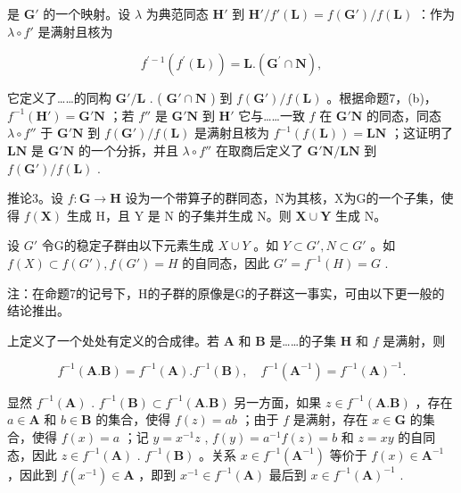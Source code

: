 是 \(\mathbf{G}'\) 的一个映射。设 \(\lambda\) 为典范同态 \(\mathbf{H}'\) 到 \(\mathbf{H}' / f'(\mathbf{L}) = f(\mathbf{G}') / f(\mathbf{L})\) ：作为 \(\lambda \circ f'\) 是满射且核为

\[
f ^ {\prime - 1} (f ^ {\prime} (\mathbf {L})) = \mathbf {L}. (\mathbf {G} ^ {\prime} \cap \mathbf {N}),
\]

它定义了……的同构 \(\mathbf{G}' / \mathbf{L}\) . ( \(\mathbf{G}' \cap \mathbf{N}\) ) 到 \(f(\mathbf{G}') / f(\mathbf{L})\) 。根据命题7，(b)， \(f^{-1}(\mathbf{H}') = \mathbf{G}'\mathbf{N}\) ；若 \(f''\) 是 \(\mathbf{G}'\mathbf{N}\) 到 \(\mathbf{H}'\) 它与……一致 \(f\) 在 \(\mathbf{G}'\mathbf{N}\) 的同态，同态 \(\lambda \circ f''\) 于 \(\mathbf{G}'\mathbf{N}\) 到 \(f(\mathbf{G}') / f(\mathbf{L})\) 是满射且核为 \(f^{-1}(f(\mathbf{L})) = \mathbf{L}\mathbf{N}\) ；这证明了 \(\mathbf{L}\mathbf{N}\) 是 \(\mathbf{G}'\mathbf{N}\) 的一个分拆，并且 \(\lambda \circ f''\) 在取商后定义了 \(\mathbf{G}'\mathbf{N} / \mathbf{L}\mathbf{N}\) 到 \(f(\mathbf{G}') / f(\mathbf{L})\) .

推论3。设 \(f: \mathbf{G} \to \mathbf{H}\) 设为一个带算子的群同态，N为其核，X为G的一个子集，使得 \(f(\mathbf{X})\) 生成 H，且 Y 是 N 的子集并生成 N。则 \(\mathbf{X} \cup \mathbf{Y}\) 生成 N。

设 \(G'\) 令G的稳定子群由以下元素生成 \(X \cup Y\) 。如 \(Y \subset G', N \subset G'\) 。如 \(f(X) \subset f(G'), f(G') = H\) 的自同态，因此 \(G' = f^{-1}(H) = G\) .

注：在命题7的记号下，H的子群的原像是G的子群这一事实，可由以下更一般的结论推出。

上定义了一个处处有定义的合成律。若 \(\mathbf{A}\) 和 \(\mathbf{B}\) 是……的子集 \(\mathbf{H}\) 和 \(f\) 是满射，则

\[
f^{-1} (\mathbf {A}. \mathbf {B}) = f^{-1} (\mathbf {A}). f^{-1} (\mathbf {B}), \quad f^{-1} (\mathbf {A} ^ {- 1}) = f^{-1} (\mathbf {A}) ^ {- 1}.
\]

显然 \(f^{-1}(\mathbf{A})\) . \(f^{-1}(\mathbf{B}) \subset f^{-1}(\mathbf{A}.\mathbf{B})\) 另一方面，如果 \(z \in f^{-1}(\mathbf{A}.\mathbf{B})\) ，存在 \(a \in \mathbf{A}\) 和 \(b \in \mathbf{B}\) 的集合，使得 \(f(z) = ab\) ；由于 \(f\) 是满射，存在 \(x \in \mathbf{G}\) 的集合，使得 \(f(x) = a\) ；记 \(y = x^{-1}z\) , \(f(y) = a^{-1}f(z) = b\) 和 \(z = xy\) 的自同态，因此 \(z \in f^{-1}(\mathbf{A})\) . \(f^{-1}(\mathbf{B})\) 。关系 \(x \in f^{-1}(\mathbf{A}^{-1})\) 等价于 \(f(x) \in \mathbf{A}^{-1}\) ，因此到 \(f(x^{-1}) \in \mathbf{A}\) ，即到 \(x^{-1} \in f^{-1}(\mathbf{A})\) 最后到 \(x \in f^{-1}(\mathbf{A})^{-1}\) .

